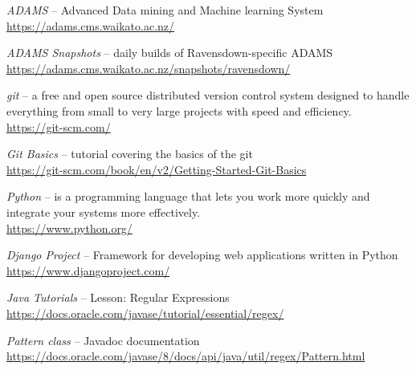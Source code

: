 
\begin{thebibliography}{999}

		\textit{ADAMS} -- Advanced Data mining and Machine learning System \\
		\url{https://adams.cms.waikato.ac.nz/}{}

		\textit{ADAMS Snapshots} -- daily builds of Ravensdown-specific ADAMS \\
		\url{https://adams.cms.waikato.ac.nz/snapshots/ravensdown/}{}

		\textit{git} -- a free and open source distributed version control
		system designed to handle everything from small to very large
		projects with speed and efficiency.  \\
		\url{https://git-scm.com/}{}

		\textit{Git Basics} -- tutorial covering the basics of the git \\
		\url{https://git-scm.com/book/en/v2/Getting-Started-Git-Basics}{}

		\textit{Python} -- is a programming language that lets you
		work more quickly and integrate your systems more effectively. \\
		\url{https://www.python.org/}{}

		\textit{Django Project} -- Framework for developing web applications
		 written in Python \\
		\url{https://www.djangoproject.com/}{}

		\textit{Java Tutorials} -- Lesson: Regular Expressions \\
		\url{https://docs.oracle.com/javase/tutorial/essential/regex/}{}

		\textit{Pattern class} -- Javadoc documentation \\
		\url{https://docs.oracle.com/javase/8/docs/api/java/util/regex/Pattern.html}{}

\end{thebibliography}
